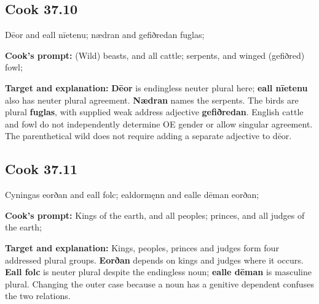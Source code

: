 \par\begin{minipage}{\linewidth}\raggedright
\subsection*{Cook 37.10}

Dēor and eall nīetenu; nædran and gefiðredan fuglas;

\textbf{Cook's prompt:} (Wild) beasts, and all cattle; serpents, and winged (gefiðred) fowl;

\textbf{Target and explanation:} \textbf{Dēor} is endingless neuter plural here; \textbf{eall nīetenu} also has neuter plural agreement. \textbf{Nædran} names the serpents. The birds are plural \textbf{fuglas}, with supplied weak address adjective \textbf{gefiðredan}. English cattle and fowl do not independently determine OE gender or allow singular agreement. The parenthetical wild does not require adding a separate adjective to dēor.

\end{minipage}\par\addvspace{4pt}

\par\begin{minipage}{\linewidth}\raggedright
\subsection*{Cook 37.11}

Cyningas eorðan and eall folc; ealdormęnn and ealle dēman eorðan;

\textbf{Cook's prompt:} Kings of the earth, and all peoples; princes, and all judges of the earth;

\textbf{Target and explanation:} Kings, peoples, princes and judges form four addressed plural groups. \textbf{Eorðan} depends on kings and judges where it occurs. \textbf{Eall folc} is neuter plural despite the endingless noun; \textbf{ealle dēman} is masculine plural. Changing the outer case because a noun has a genitive dependent confuses the two relations.

\end{minipage}\par\addvspace{4pt}

